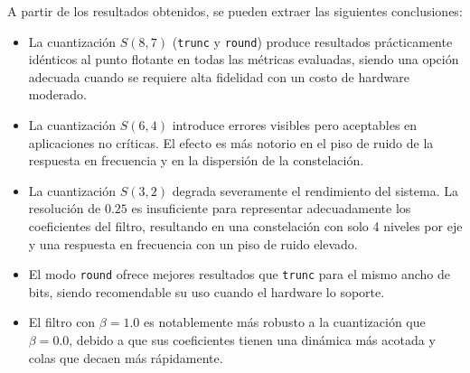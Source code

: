 \documentclass[11pt,a4paper]{article}
\begin{document}
A partir de los resultados obtenidos, se pueden extraer las siguientes
conclusiones:

\begin{itemize}
    \item La cuantización $S(8,7)$ (\texttt{trunc} y \texttt{round}) produce resultados
          prácticamente idénticos al punto flotante en todas las métricas evaluadas,
          siendo una opción adecuada cuando se requiere alta fidelidad con un costo de
          hardware moderado.

    \item La cuantización $S(6,4)$ introduce errores visibles pero aceptables en
          aplicaciones no críticas. El efecto es más notorio en el piso de ruido de la
          respuesta en frecuencia y en la dispersión de la constelación.

    \item La cuantización $S(3,2)$ degrada severamente el rendimiento del sistema. La
          resolución de $0.25$ es insuficiente para representar adecuadamente los
          coeficientes del filtro, resultando en una constelación con solo 4 niveles por
          eje y una respuesta en frecuencia con un piso de ruido elevado.

    \item El modo \texttt{round} ofrece mejores resultados que \texttt{trunc} para el
          mismo ancho de bits, siendo recomendable su uso cuando el hardware lo soporte.

    \item El filtro con $\beta = 1.0$ es notablemente más robusto a la cuantización que
          $\beta = 0.0$, debido a que sus coeficientes tienen una dinámica más acotada y
          colas que decaen más rápidamente.
\end{itemize}
\end{document}
